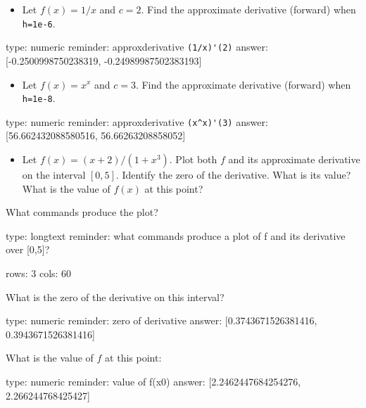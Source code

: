 \documentclass[12pt]{article}
\begin{document}
\begin{itemize}
\itemsep1pt\parskip0pt
\item
  Let $f(x) = 1/x$ and $c=2$. Find the approximate derivative (forward)
  when \texttt{h=1e-6}.
\end{itemize}

\begin{answer}
    type: numeric
    reminder: approxderivative \verb+(1/x)'(2)+
    answer: [-0.2500998750238319, -0.24989987502383193]

\end{answer}

\begin{itemize}
\itemsep1pt\parskip0pt
\item
  Let $f(x) = x^x$ and $c=3$. Find the approximate derivative (forward)
  when \texttt{h=1e-8}.
\end{itemize}

\begin{answer}
    type: numeric
    reminder: approxderivative \verb+(x^x)'(3)+
    answer: [56.662432088580516, 56.66263208858052]

\end{answer}

\begin{itemize}
\itemsep1pt\parskip0pt
\item
  Let $f(x) = (x + 2)/(1 + x^3)$. Plot both $f$ and its approximate
  derivative on the interval $[0,5]$. Identify the zero of the
  derivative. What is its value? What is the value of $f(x)$ at this
  point?
\end{itemize}

What commands produce the plot?

\begin{answer}
type: longtext
reminder: what commands produce a plot of f and its derivative over [0,5]?

rows: 3
cols: 60
\end{answer}

What is the zero of the derivative on this interval?

\begin{answer}
    type: numeric
    reminder: zero of derivative
    answer: [0.3743671526381416, 0.3943671526381416]

\end{answer}

What is the value of $f$ at this point:

\begin{answer}
    type: numeric
    reminder: value of f(x0)
    answer: [2.2462447684254276, 2.266244768425427]

\end{answer}
\end{document}
